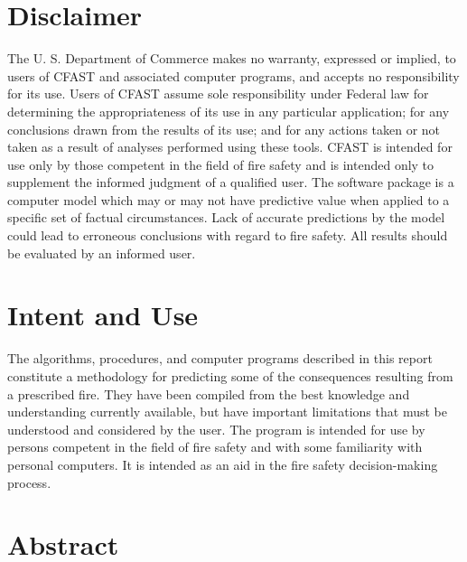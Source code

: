 \documentclass[12pt]{book}
\begin{document}
\newpage

\frontmatter

\pagestyle{plain}
\setcounter{page}{3}




\chapter{Disclaimer}

The U. S. Department of Commerce makes no warranty, expressed or implied, to users of
CFAST and associated computer programs, and accepts no responsibility for its use.  Users of
CFAST assume sole responsibility under Federal law for determining the appropriateness of its
use in any particular application; for any conclusions drawn from the results of its use; and for
any actions taken or not taken as a result of analyses performed using these tools.
CFAST is intended for use only by those competent in the field of fire safety and is intended
only to supplement the informed judgment of a qualified user. The software package is a
computer model which may or may not have predictive value when applied to a specific set of
factual circumstances. Lack of accurate predictions by the model could lead to erroneous
conclusions with regard to fire safety. All results should be evaluated by an informed user.


\chapter{Intent and Use}

The algorithms, procedures, and computer programs described in this report constitute a
methodology for predicting some of the consequences resulting from a prescribed fire.  They
have been compiled from the best knowledge and understanding currently available, but have
important limitations that must be understood and considered by the user.  The program is
intended for use by persons competent in the field of fire safety and with some familiarity with
personal computers. It is intended as an aid in the fire safety decision-making process.

\chapter{Abstract}
\end{document}

